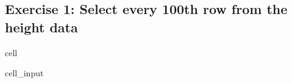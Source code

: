 \documentclass[letterpaper,10pt,english]{jupyterBook}
\begin{document}
\subsection{Exercise 1: Select every 100th row from the height data}
\label{\detokenize{exercises_unit_3:exercise-1-select-every-100th-row-from-the-height-data}}
\begin{sphinxuseclass}{cell}\begin{sphinxVerbatimInput}

\begin{sphinxuseclass}{cell_input}
\begin{sphinxVerbatim}[commandchars=\\\{\}]
\end{sphinxVerbatim}

\end{sphinxuseclass}\end{sphinxVerbatimInput}

\end{sphinxuseclass}
\end{document}
